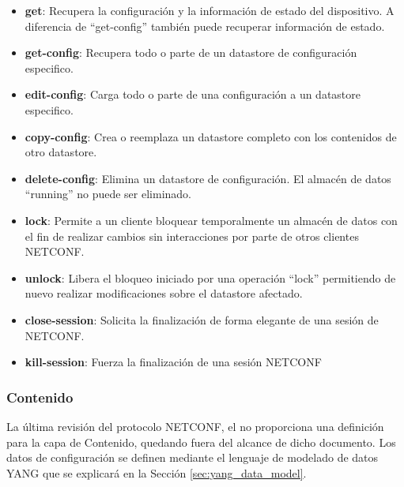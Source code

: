 \begin{itemize}
    \item \textbf{get}: Recupera la configuración y la información de estado del dispositivo. A diferencia de \enquote{get-config} también puede recuperar información de estado.
    \item \textbf{get-config}: Recupera todo o parte de un datastore de configuración especifico. 
    \item \textbf{edit-config}: Carga todo o parte de una configuración a un datastore especifico.
    \item \textbf{copy-config}: Crea o reemplaza un datastore completo con los contenidos de otro datastore.
    \item \textbf{delete-config}: Elimina un datastore de configuración. El almacén de datos \enquote{running} no puede ser eliminado.
    \item \textbf{lock}: Permite a un cliente bloquear temporalmente un almacén de datos con el fin de realizar cambios sin interacciones por parte de otros clientes NETCONF.
    \item \textbf{unlock}: Libera el bloqueo iniciado por una operación \enquote{lock} permitiendo de nuevo realizar modificaciones sobre el datastore afectado.
    \item \textbf{close-session}: Solicita la finalización de forma elegante de una sesión de \gls{NETCONF}.
    \item \textbf{kill-session}: Fuerza la finalización de una sesión NETCONF
\end{itemize}

\subsubsection{Contenido}

La última revisión del protocolo NETCONF, el \cite{RFC6241} no proporciona una definición para la capa de Contenido, quedando fuera del alcance de dicho documento. Los datos de configuración se definen mediante el lenguaje de modelado de datos YANG que se explicará en la Sección \ref{sec:yang_data_model}.




